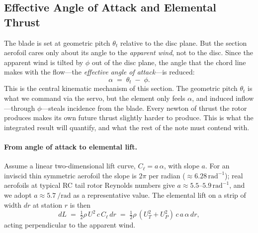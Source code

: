 \documentclass[11pt,a4paper]{article}
\newcommand{\thetat}{\theta_t}
\begin{document}
\subsection{Effective Angle of Attack and Elemental Thrust}\label{ssec:alpha_dT}

The blade is set at geometric pitch \(\thetat\) relative to the disc
plane. But the section aerofoil cares only about its angle to the
\emph{apparent wind}, not to the disc. Since the apparent wind is
tilted by \(\phi\) out of the disc plane, the angle that the chord line
makes with the flow---the \emph{effective angle of attack}---is reduced:
\begin{equation}
\alpha \;=\; \thetat \;-\; \phi.
\label{eq:alpha}
\end{equation}
This is the central kinematic mechanism of this section. The geometric
pitch \(\thetat\) is what we command via the servo, but the element
only feels \(\alpha\), and induced inflow---through \(\phi\)---steals
incidence from the blade. Every newton of thrust the rotor produces
makes its own future thrust slightly harder to produce. This is what
the integrated result will quantify, and what the rest of the note must
contend with.

\paragraph{From angle of attack to elemental lift.}
Assume a linear two-dimensional lift curve,
\(C_\ell = a\,\alpha\), with slope \(a\). For an inviscid thin
symmetric aerofoil the slope is \(2\pi\) per radian
(\(\approx 6.28\,\text{rad}^{-1}\)); real aerofoils at typical RC tail
rotor Reynolds numbers give \(a\approx 5.5\)--\(5.9\,\text{rad}^{-1}\),
and we adopt \(a\approx \SI{5.7}{\per\radian}\) as a representative
value. The elemental lift on a strip of width \(dr\) at station \(r\)
is then
\begin{equation}
dL \;=\; \tfrac{1}{2}\rho\,U^2\,c\,C_\ell\,dr
   \;=\; \tfrac{1}{2}\rho\,(U_T^2+U_P^2)\,c\,a\,\alpha\,dr,
\end{equation}
acting perpendicular to the apparent wind.
\end{document}
